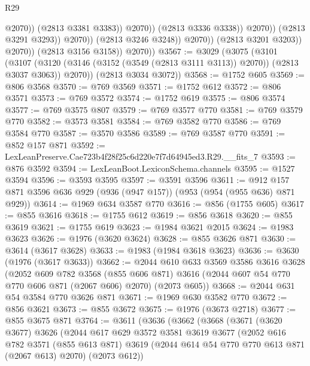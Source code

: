 \begin{lexlean}{R29}
\begin{coremodule}
                                            @2070))
                                        (@2813 @3381 @3383))
                                      @2070))
                                  (@2813 @3336 @3338))
                                @2070))
                            (@2813 @3291 @3293))
                          @2070))
                      (@2813 @3246 @3248))
                    @2070))
                (@2813 @3201 @3203))
              @2070))
          (@2813 @3156 @3158))
        @2070))
@3567 := @3029
    (@3075
      (@3101
        (@3107 (@3120 (@3146 (@3152 (@3549 (@2813 @3111 @3113)) @2070)) (@2813 @3037 @3063)) @2070))
      (@2813 @3034 @3072))
@3568 := @1752 @605
@3569 := @806 @3568
@3570 := @769 @3569
@3571 := @1752 @612
@3572 := @806 @3571
@3573 := @769 @3572
@3574 := @1752 @619
@3575 := @806 @3574
@3577 := @769 @3575 @807
@3579 := @769 @3577 @770
@3581 := @769 @3579 @770
@3582 := @3573 @3581
@3584 := @769 @3582 @770
@3586 := @769 @3584 @770
@3587 := @3570 @3586
@3589 := @769 @3587 @770
@3591 := @852 @157 @871
@3592 := LexLeanPreserve.Cae723b4f28f25c6d220e7f7d64945ed3.R29.__fits_7
@3593 := @876 @3592
@3594 := LexLeanBoot.LexiconSchema.channels
@3595 := @1527 @3594
@3596 := @3593 @3595
@3597 := @3591 @3596
@3611 := @912 @157 @871 @3596 @636 @929 (@936 (@947 @157)) (@953 (@954 (@955 @636) @871 @929))
@3614 := @1969 @634 @3587 @770
@3616 := @856 (@1755 @605)
@3617 := @855 @3616
@3618 := @1755 @612
@3619 := @856 @3618
@3620 := @855 @3619
@3621 := @1755 @619
@3623 := @1984 @3621 @2015
@3624 := @1983 @3623
@3626 := @1976 (@3620 @3624)
@3628 := @855 @3626 @871
@3630 := @3614 (@3617 @3628)
@3633 := @1983 (@1984 @3618 @3623)
@3636 := @3630 (@1976 (@3617 @3633))
@3662 := @2044
    @610
    @633
    @3569
    @3586
    @3616
    @3628
    (@2052
      @609
      @782
      @3568
      (@855 @606 @871)
      @3616
      (@2044 @607 @54 @770 @770 @606 @871 (@2067 @606) @2070)
      (@2073 @605))
@3668 := @2044 @631 @54 @3584 @770 @3626 @871
@3671 := @1969 @630 @3582 @770
@3672 := @856 @3621
@3673 := @855 @3672
@3675 := @1976 (@3673 @2718)
@3677 := @855 @3675 @871
@3764 := @3611
    (@3636
      (@3662
        (@3668
          (@3671
            (@3620 @3677)
            @3626
            (@2044
              @617
              @629
              @3572
              @3581
              @3619
              @3677
              (@2052
                @616
                @782
                @3571
                (@855 @613 @871)
                @3619
                (@2044 @614 @54 @770 @770 @613 @871 (@2067 @613) @2070)
                (@2073 @612))

\end{coremodule}
\end{lexlean}
